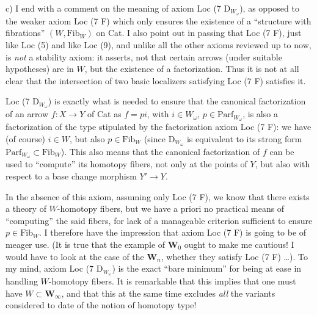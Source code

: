 c) I end with a comment on the meaning of axiom Loc (7 D$_{W_\omega}$), as opposed to the weaker axiom Loc (7 F) which only ensures the existence of a ``structure with fibrations'' $(W, \mathrm{Fib}_W)$ on Cat. I also point out in passing that Loc (7 F), just like Loc (5) and like Loc (9), and unlike all the other axioms reviewed up to now, is \textit{not} a stability axiom: it asserts, not that certain arrows (under suitable hypotheses) are in $W$, but the existence of a factorization. Thus it is
not at all clear that the intersection of two basic localizers satisfying Loc (7 F) satisfies it.

Loc (7 D$_{W_\omega}$) is exactly what is needed to ensure that the canonical factorization of an arrow $f : X \longrightarrow Y$ of Cat as $f = pi$, with $i \in W_\omega$, $p \in \mathrm{Parf}_{W_\omega}$, is also a factorization of the type stipulated by the factorization axiom Loc (7 F): we have (of course) $i \in W$, but also $p \in \mathrm{Fib}_W$ (since D$_{W_\omega}$ is equivalent to its strong form $\mathrm{Parf}_{W_\omega} \subset \mathrm{Fib}_W$). This also means that the canonical factorization of $f$ can be used to ``compute'' its homotopy fibers, not only at the points of $Y$, but also with respect to a base change morphism $Y' \longrightarrow Y$.

In the absence of this axiom,
assuming only Loc (7 F), we know that there exists a theory of $W$-homotopy fibers, but we have a priori no practical means of ``computing'' the said fibers, for lack of a manageable criterion sufficient to ensure $p \in \mathrm{Fib}_W$. I therefore have the impression that axiom Loc (7 F) is going to be of meager use. (It is true that the example of $\mathbf{W}_0$ ought to make me cautious! I would have to look at the case of the $\mathbf{W}_n$, whether they satisfy Loc (7 F) \ldots). To my mind, axiom Loc (7 D$_{W_\omega}$) is the exact ``bare minimum'' for being at ease in handling $W$-homotopy fibers. It is remarkable that this implies that one must have $W \subset \mathbf{W}_\infty$, and that this at the same time excludes \textit{all} the variants considered to date of the notion of homotopy type!

